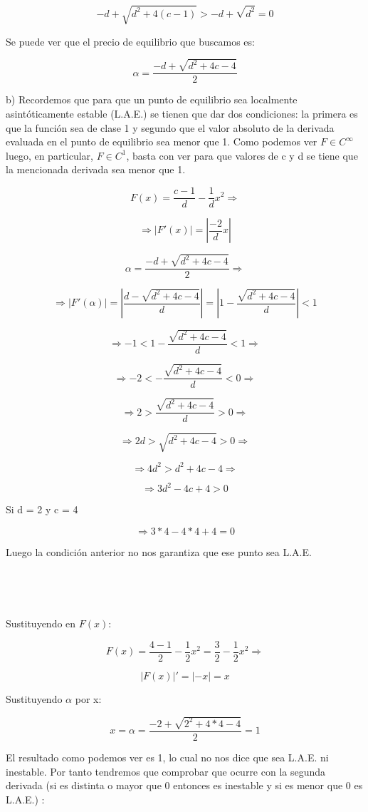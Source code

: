 \documentclass[11pt, a4paper, titlepage]{article}
\theoremstyle{theorem-style}
\theoremstyle{definition-style}
\theoremstyle{remark-style}
\theoremstyle{example-style}
\begin{document}
\[
-d + \sqrt{d^2 +4(c-1)} > -d + \sqrt{d^{2}} = 0
\]

Se puede ver que el precio de equilibrio que buscamos es:

\[
\alpha = \frac{-d+\sqrt{d^{2} +4c-4}}{2}
\]

b) 
Recordemos que para que un punto de equilibrio sea localmente asintóticamente estable (L.A.E.) se tienen que dar dos condiciones: la primera es que la funci\'on sea de clase 1 y segundo que el valor absoluto de la derivada evaluada en el punto de equilibrio sea menor que 1. Como podemos ver $F \in C^{\infty}$ luego, en particular, $F \in C^{1}$, basta con ver para que valores de c y d se tiene que la mencionada derivada sea menor que 1.

\[
F(x) = \frac{c-1}{d} - \frac{1}{d}x^{2} \Rightarrow
\]

\[
\Rightarrow |F'(x)| = |\frac{-2}{d}x| 
\]

\[
\alpha = \frac{-d+\sqrt{d^{2} +4c-4}}{2} \Rightarrow
\]

\[
\Rightarrow |F'(\alpha)| = |\frac{d-\sqrt{d^{2}+4c-4}}{d}| = | 1 - \frac {\sqrt{d^{2}+4c-4}}{d}| < 1
\]

\[
\Rightarrow -1 <  1 - \frac {\sqrt{d^{2}+4c-4}}{d} < 1 \Rightarrow
\]

\[
\Rightarrow -2 < - \frac {\sqrt{d^{2}+4c-4}}{d} < 0 \Rightarrow
\]

\[
\Rightarrow 2 > \frac {\sqrt{d^{2}+4c-4}}{d} > 0 \Rightarrow
\]

\[
\Rightarrow 2d > \sqrt{d^{2}+4c-4} > 0 \Rightarrow
\]

\[
\Rightarrow 4d^{2} > d^{2}+4c-4 \Rightarrow 
\]

\[
\Rightarrow 3d^{2}-4c+4 > 0
\]

Si d = 2 y c = 4

\[
\Rightarrow 3*4 - 4*4 +4 = 0 
\]

Luego la condici\'on anterior no nos garantiza que ese punto sea L.A.E.
\

\

\

Sustituyendo en $F(x)$:

\[
F(x) = \frac{4-1}{2} - \frac{1}{2}x^{2} = \frac{3}{2} - \frac{1}{2}x^{2}\Rightarrow
\]

\[
|F(x)|' = |-x| = x 
\]

Sustituyendo $\alpha$ por x:

\[
x = \alpha = \frac{-2+\sqrt{2^{2} +4*4-4}}{2} = 1
\]

El resultado como podemos ver es 1, lo cual no nos dice que sea L.A.E. ni inestable. Por tanto tendremos que comprobar que ocurre con la segunda derivada (si es distinta o mayor que 0 entonces es inestable y si es menor que 0 es L.A.E.) :
\end{document}
